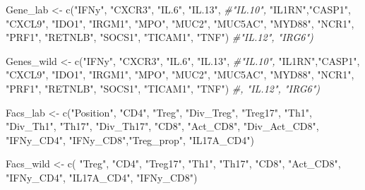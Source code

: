 \documentclass[
]{article}
\newenvironment{Shaded}{\begin{snugshade}}{\end{snugshade}}
\newcommand{\CommentTok}[1]{\textcolor[rgb]{0.56,0.35,0.01}{\textit{#1}}}
\newcommand{\FunctionTok}[1]{\textcolor[rgb]{0.00,0.00,0.00}{#1}}
\newcommand{\NormalTok}[1]{#1}
\newcommand{\OtherTok}[1]{\textcolor[rgb]{0.56,0.35,0.01}{#1}}
\newcommand{\StringTok}[1]{\textcolor[rgb]{0.31,0.60,0.02}{#1}}
\begin{document}
\begin{Shaded}
\begin{Highlighting}[]
\NormalTok{Gene\_lab   }\OtherTok{\textless{}{-}} \FunctionTok{c}\NormalTok{(}\StringTok{"IFNy"}\NormalTok{, }\StringTok{"CXCR3"}\NormalTok{, }\StringTok{"IL.6"}\NormalTok{, }\StringTok{"IL.13"}\NormalTok{, }\CommentTok{\#"IL.10",}
                \StringTok{"IL1RN"}\NormalTok{,}\StringTok{"CASP1"}\NormalTok{, }\StringTok{"CXCL9"}\NormalTok{, }\StringTok{"IDO1"}\NormalTok{, }\StringTok{"IRGM1"}\NormalTok{, }\StringTok{"MPO"}\NormalTok{, }
                \StringTok{"MUC2"}\NormalTok{, }\StringTok{"MUC5AC"}\NormalTok{, }\StringTok{"MYD88"}\NormalTok{, }\StringTok{"NCR1"}\NormalTok{, }\StringTok{"PRF1"}\NormalTok{, }\StringTok{"RETNLB"}\NormalTok{, }\StringTok{"SOCS1"}\NormalTok{, }
                \StringTok{"TICAM1"}\NormalTok{, }\StringTok{"TNF"}\NormalTok{) }\CommentTok{\#"IL.12", "IRG6")}



\NormalTok{Genes\_wild   }\OtherTok{\textless{}{-}} \FunctionTok{c}\NormalTok{(}\StringTok{"IFNy"}\NormalTok{, }\StringTok{"CXCR3"}\NormalTok{, }\StringTok{"IL.6"}\NormalTok{, }\StringTok{"IL.13"}\NormalTok{, }\CommentTok{\#"IL.10", }
                  \StringTok{"IL1RN"}\NormalTok{,}\StringTok{"CASP1"}\NormalTok{, }\StringTok{"CXCL9"}\NormalTok{, }\StringTok{"IDO1"}\NormalTok{, }\StringTok{"IRGM1"}\NormalTok{, }\StringTok{"MPO"}\NormalTok{, }
                  \StringTok{"MUC2"}\NormalTok{, }\StringTok{"MUC5AC"}\NormalTok{, }\StringTok{"MYD88"}\NormalTok{, }\StringTok{"NCR1"}\NormalTok{, }\StringTok{"PRF1"}\NormalTok{, }\StringTok{"RETNLB"}\NormalTok{, }\StringTok{"SOCS1"}\NormalTok{, }
                  \StringTok{"TICAM1"}\NormalTok{, }\StringTok{"TNF"}\NormalTok{) }\CommentTok{\#, "IL.12", "IRG6")}



\NormalTok{Facs\_lab }\OtherTok{\textless{}{-}} \FunctionTok{c}\NormalTok{(}\StringTok{"Position"}\NormalTok{, }\StringTok{"CD4"}\NormalTok{, }\StringTok{"Treg"}\NormalTok{, }\StringTok{"Div\_Treg"}\NormalTok{, }\StringTok{"Treg17"}\NormalTok{, }\StringTok{"Th1"}\NormalTok{, }
                    \StringTok{"Div\_Th1"}\NormalTok{, }\StringTok{"Th17"}\NormalTok{, }\StringTok{"Div\_Th17"}\NormalTok{, }\StringTok{"CD8"}\NormalTok{, }\StringTok{"Act\_CD8"}\NormalTok{, }
                    \StringTok{"Div\_Act\_CD8"}\NormalTok{, }\StringTok{"IFNy\_CD4"}\NormalTok{, }\StringTok{"IFNy\_CD8"}\NormalTok{,}\StringTok{"Treg\_prop"}\NormalTok{, }
                    \StringTok{"IL17A\_CD4"}\NormalTok{)  }

\NormalTok{Facs\_wild }\OtherTok{\textless{}{-}} \FunctionTok{c}\NormalTok{( }\StringTok{"Treg"}\NormalTok{, }\StringTok{"CD4"}\NormalTok{, }\StringTok{"Treg17"}\NormalTok{, }\StringTok{"Th1"}\NormalTok{, }\StringTok{"Th17"}\NormalTok{, }\StringTok{"CD8"}\NormalTok{,}
                     \StringTok{"Act\_CD8"}\NormalTok{, }\StringTok{"IFNy\_CD4"}\NormalTok{, }\StringTok{"IL17A\_CD4"}\NormalTok{, }\StringTok{"IFNy\_CD8"}\NormalTok{)}
\end{Highlighting}
\end{Shaded}
\end{document}
